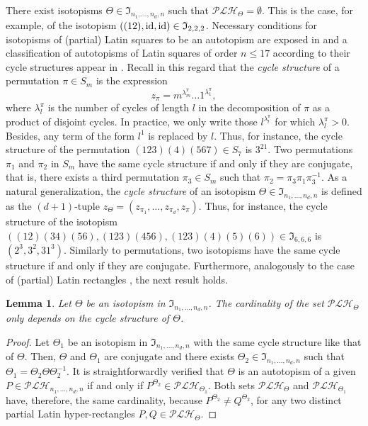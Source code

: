 \documentclass{article}
\newtheorem{lem}[thm]{Lemma}
\begin{document}
There exist isotopisms $\Theta\in \mathfrak{I}_{n_1,\ldots,n_d,n}$ such that $\mathcal{PLH}_{\Theta}=\emptyset$. This is the case, for example, of the isotopism $((12),{\rm id},{\rm 
id})\in\mathfrak{I}_{2,2,2}$. Necessary conditions for isotopisms of (partial) Latin squares to be an autotopism are exposed in \cite{Falcon2012, Falcon2013, McKay2005, Sade1968,  Stones2012} and a classification of autotopisms of Latin squares of order $n\leq 17$ according to their cycle structures appear in \cite{Falcon2012, Stones2012}. Recall in this regard that the {\em cycle structure} of a permutation $\pi\in S_m$ is the expression  
\[z_{\pi}=m^{\lambda_m^{\pi}}\ldots 1^{\lambda_1^{\pi}},\] 
where $\lambda_l^{\pi}$ is the number of cycles of length $l$ in the decomposition of $\pi$ as a product of disjoint cycles. 
In practice, we only write those $l^{\lambda_l^{\pi}}$ for which $\lambda_l^{\pi}>0$. Besides, any term of the form $l^1$ is replaced by $l$. Thus, for instance, the cycle structure of the permutation $(123)(4)(567)\in S_7$ is $3^21$. Two permutations $\pi_1$ and $\pi_2$ in $S_m$ have the same cycle structure if and only if they are conjugate, that is, there exists a third permutation $\pi_3\in S_m$ such that $\pi_2=\pi_3\pi_1\pi_3^{-1}$. As a natural generalization, the {\em cycle structure} of an isotopism $\Theta\in \mathfrak{I}_{n_1,\ldots,n_d,n}$ is defined as the $(d+1)$-tuple $z_{\Theta}=(z_{\pi_1},\ldots,z_{\pi_d},z_{\pi})$. Thus, for instance, the cycle structure of the isotopism $((12)(34)(56),(123)(456),(123)(4)(5)(6))\in \mathfrak{I}_{6,6,6}$ is $(2^3,3^2,31^3)$. Similarly to permutations, two isotopisms have the same cycle structure if and only if they are conjugate. Furthermore, analogously to the case of (partial) Latin rectangles \cite{Falcon2013, Falcon2015, Stones2012}, the next result holds.

\begin{lem}\label{lem_CS} Let $\Theta$ be an isotopism in $\mathfrak{I}_{n_1,\ldots,n_d,n}$. The cardinality of the set $\mathcal{PLH}_{\Theta}$ only depends on the cycle structure of $\Theta$.
\end{lem}

\begin{proof} Let $\Theta_1$ be an isotopism in $\mathfrak{I}_{n_1,\ldots,n_d,n}$ with the same cycle structure like that of $\Theta$. Then, $\Theta$ and $\Theta_1$ are conjugate and 
there 
exists $\Theta_2\in \mathfrak{I}_{n_1,\ldots,n_d,n}$ such that $\Theta_1=\Theta_2\Theta\Theta_2^{-1}$. It is straightforwardly verified that $\Theta$ is an autotopism of a given $P\in\mathcal{PLH}_{n_1,\ldots,n_d,n}$ if and only if $P^{\Theta_2}\in\mathcal{PLH}_{\Theta_1}$. Both sets $\mathcal{PLH}_{\Theta}$ and $\mathcal{PLH}_{\Theta_1}$ have, therefore, the same cardinality, because $P^{\Theta_2}\neq Q^{\Theta_2}$, for any two distinct partial Latin hyper-rectangles $P,Q\in\mathcal{PLH}_{\Theta}$.
\end{proof}
\end{document}
